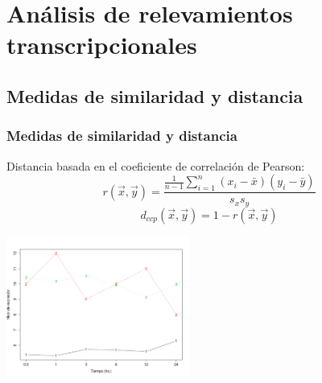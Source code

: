 \documentclass[serif,9pt, t]{beamer}
\begin{document}
\section{Análisis de relevamientos transcripcionales}

\subsection{Medidas de similaridad y distancia}
\begin{frame} \frametitle{Medidas de similaridad y distancia} 
\centering
	Distancia basada en el coeficiente de correlación de Pearson:\\
	\begin{equation}
		r(\vec{x}, \vec{y}) = \frac{\frac{1}{n-1}\sum\limits_{i=1}^n(x_i-\bar{x})(y_i-\bar{y})}{s_x s_y}
	\end{equation}
	\begin{equation}
		d_{ccp}(\vec{x}, \vec{y}) = 1-r(\vec{x}, \vec{y})
	\end{equation}

	\centering	
	\includegraphics[width=0.45\textwidth]{perfiles_ejemplo_metricas.pdf}

\end{frame}
\end{document}

